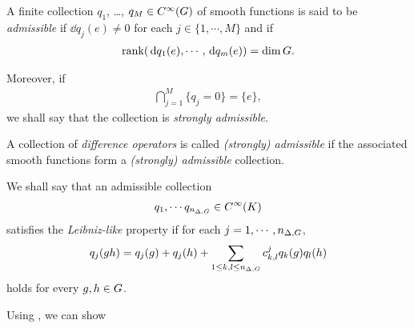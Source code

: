 \begin{definition}
\label{definition:admissibility_of_difference_operators}
    A finite collection $q_1$, \dots, $q_M \in {C^\infty(G)}$ of smooth functions is said to be \emph{admissible}
    if $\dd q_j(e) \neq 0$ for each $j \in \{1, \cdots, M\}$
    and if
    \begin{align*}
        \operatorname{rank}(\,\mathrm{d} q_1(e), \cdots, \,\mathrm{d} q_m(e)) = \dim G.
    \end{align*}

    Moreover, if
    \begin{align*}
        \bigcap_{j = 1}^M \{ q_j = 0 \} = \{e\},
    \end{align*}
    we shall say that the collection is \emph{strongly admissible}.

    A collection of \emph{difference operators} is called \emph{(strongly) admissible}
    if the associated smooth functions form a \emph{(strongly) admissible} collection.
\end{definition}

\begin{definition}
\label{definition:Leibniz-like_property_for_smooth_functions}
    We shall say that an admissible collection
    \begin{align*}
        q_1, \cdots q_{n_{\Delta, G}} \in {C^\infty(K)}
    \end{align*}
    satisfies the \emph{Leibniz-like} property
    if for each $j = 1, \cdots, n_{\Delta, G}$,
    \begin{align*}
        q_j(g h) = q_j(g) + q_j(h) + \sum_{1 \leq k, l \leq n_{\Delta, G}} c^j_{k, l} q_k(g) q_l(h)
    \end{align*}
    holds for every $g, h \in G$.
\end{definition}

Using \cite[Lemma 4.4]{RuzhanskyTurunenWirth10}, we can show

